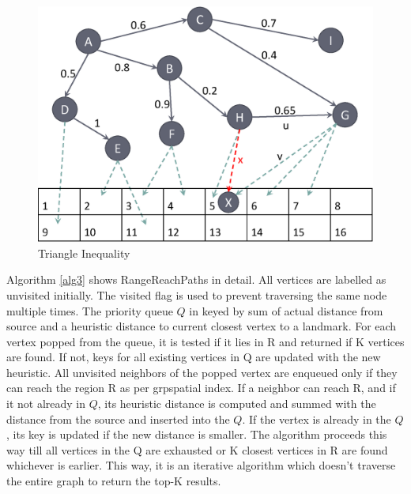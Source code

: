 \begin{figure}[t]
    \centering
    \includegraphics[width=0.88\linewidth]{images/triangle_inequality.eps}
    \caption{Triangle Inequality}
    \label{fig:tri-ine}
\end{figure}

Algorithm \ref{alg3} shows RangeReachPaths in detail. All vertices are labelled as unvisited initially. The visited flag is used to prevent traversing the same node multiple times. The priority queue $Q$ in keyed by sum of actual distance from source and a heuristic distance to current closest vertex to a landmark. For each vertex popped from the queue, it is tested if it lies in R and returned if K vertices are found. If not, keys for all existing vertices in Q are updated with the new heuristic. All unvisited neighbors of the popped vertex are enqueued only if they can reach the region R as per {grpspatial} index. If a neighbor can reach R, and if it not already in $Q$, its heuristic distance is computed and summed with the distance from the source and inserted into the $Q$. If the vertex is already in the $Q$, its key is updated if the new distance is smaller. The algorithm proceeds this way till all vertices in the Q are exhausted or K closest vertices in R are found whichever is earlier. This way, it is an iterative algorithm which doesn't traverse the entire graph to return the top-K results.

		
